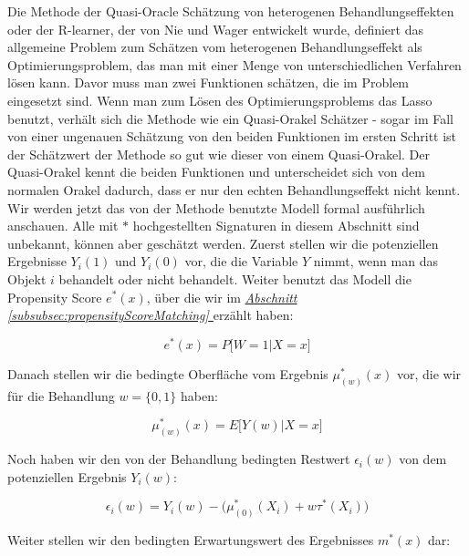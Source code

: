 \documentclass[12pt,a4paper,twoside]{scrartcl}
\numberwithin{equation}{section}
\newcommand{\refsec}[1]{\emph{\hyperref[#1]{Abschnitt \ref*{#1} }}}
\begin{document}
Die Methode der Quasi-Oracle Schätzung von heterogenen Behandlungseffekten oder der R-learner, der von Nie und Wager entwickelt wurde, definiert das allgemeine Problem zum Schätzen vom heterogenen Behandlungseffekt als Optimierungsproblem, das man mit einer Menge von unterschiedlichen Verfahren lösen kann. Davor muss man zwei Funktionen schätzen, die im Problem eingesetzt sind. Wenn man zum Lösen des Optimierungsproblems das Lasso benutzt, verhält sich die Methode wie ein Quasi-Orakel Schätzer - sogar im Fall von einer ungenauen Schätzung von den beiden Funktionen im ersten Schritt ist der Schätzwert der Methode so gut wie dieser von einem Quasi-Orakel. Der Quasi-Orakel kennt die beiden Funktionen und unterscheidet sich von dem normalen Orakel dadurch, dass er nur den echten Behandlungseffekt nicht kennt. Wir werden jetzt das von der Methode benutzte Modell formal ausführlich anschauen. Alle mit $*$ hochgestellten Signaturen in diesem Abschnitt sind unbekannt, können aber geschätzt werden. Zuerst stellen wir die potenziellen Ergebnisse $Y_i(1)$ und $Y_i(0)$ vor, die die Variable $Y$ nimmt, wenn man das Objekt $i$ behandelt oder nicht behandelt. Weiter benutzt das Modell die Propensity Score $e^*(x)$, über die wir im \refsec{subsubsec:propensityScoreMatching} erzählt haben:\par

\begin{equation}\label{eq:2.14}
  e^*(x) = P \big [W=1|X=x \big ]
\end{equation}

\noindent
Danach stellen wir die bedingte Oberfläche vom Ergebnis $\mu^*_{(w)}(x)$ vor, die wir für die Behandlung $w =\{0,1\}$ haben:\par

\begin{equation}\label{eq:2.15}
 \mu^*_{(w)}(x) = E \big [Y(w)|X=x \big ]
\end{equation}
 
\noindent
Noch haben wir den von der Behandlung bedingten Restwert $\epsilon_i(w)$ von dem potenziellen Ergebnis $Y_i(w)$:\par

\begin{equation}\label{eq:2.16}
 \epsilon_i(w) = Y_i(w)- \big (\mu^*_{(0)}(X_i) + w\tau^*(X_i) \big )   
\end{equation}

\noindent
Weiter stellen wir den bedingten Erwartungswert des Ergebnisses $m^*(x)$ dar:\par
\end{document}
